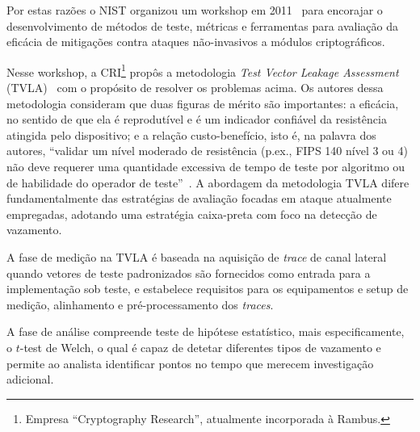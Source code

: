 \documentclass{SBCbookchapter}
\begin{document}
Por estas razões o NIST organizou um workshop em 2011~\cite{NIST_NIAT_2011} para encorajar o desenvolvimento de métodos de teste, métricas e ferramentas para avaliação da eficácia de mitigações contra ataques não-invasivos a módulos criptográficos.


Nesse workshop, a CRI\footnote{Empresa ``Cryptography Research'', atualmente incorporada à Rambus.} propôs a metodologia \textit{Test Vector Leakage Assessment} (TVLA)~\cite{Goodwill2011} com o propósito de resolver os problemas acima. Os autores dessa metodologia consideram que duas figuras de mérito são importantes: a eficácia, no sentido de que ela é reprodutível e é um indicador confiável da resistência atingida pelo dispositivo; e a relação custo-benefício, isto é, na palavra dos autores, ``validar um nível moderado de resistência (p.ex., FIPS 140 nível 3 ou 4) não deve requerer uma quantidade excessiva de tempo de teste por algoritmo ou de habilidade do operador de teste''~\cite{Goodwill2011}. A abordagem da metodologia TVLA difere fundamentalmente das estratégias de avaliação focadas em ataque atualmente empregadas, adotando uma estratégia caixa-preta com foco na detecção de vazamento.

A fase de medição na TVLA é baseada na aquisição de \emph{trace} de canal lateral quando vetores de teste padronizados são fornecidos como entrada para a implementação sob teste, e estabelece requisitos para os equipamentos e setup de medição, alinhamento e pré-processamento dos \emph{traces}.

A fase de análise compreende teste de hipótese estatístico, mais especificamente, o $t$-test de Welch, o qual é capaz de detetar diferentes tipos de vazamento e permite ao analista identificar pontos no tempo que merecem investigação adicional.
\end{document}
